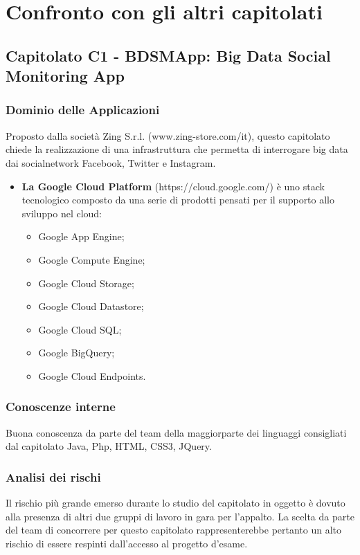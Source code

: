 \section{Confronto con gli altri capitolati}
\subsection{Capitolato C1 - BDSMApp: Big Data Social Monitoring App}
  \subsubsection{Dominio delle Applicazioni}
  Proposto dalla società Zing S.r.l. (www.zing-store.com/it), questo capitolato chiede la realizzazione di una infrastruttura che permetta di interrogare big data dai socialnetwork Facebook, Twitter e Instagram.
  \begin{itemize}
  	\item \textbf{La Google Cloud Platform} (https://cloud.google.com/) è uno stack tecnologico composto da una serie di prodotti pensati per il supporto allo sviluppo nel cloud:
  	\begin{itemize}
  		\item Google App Engine;
  		\item Google Compute Engine;
        \item Google Cloud Storage;
  		\item Google Cloud Datastore;
  		\item Google Cloud SQL;
  		\item Google BigQuery;
  		\item Google Cloud Endpoints.
  	\end{itemize}
  \end{itemize}
  \subsubsection{Conoscenze interne}
  Buona conoscenza da parte del team della maggiorparte dei linguaggi consigliati dal capitolato Java, Php, HTML, CSS3, JQuery.
  \subsubsection{Analisi dei rischi}
  Il rischio più grande emerso durante lo studio del capitolato in oggetto è dovuto alla presenza di altri due gruppi di lavoro in gara per l'appalto. La scelta da parte del team di concorrere per questo capitolato rappresenterebbe pertanto un alto rischio di essere respinti dall'accesso al progetto d'esame.
